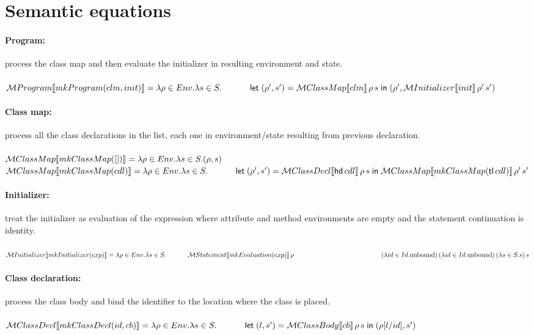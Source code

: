 \documentclass[11pt,a4paper,twoside]{article}
\begin{document}
\section{Semantic equations}

\paragraph{Program:} process the class map and then evaluate the initializer in resulting environment and state.\\\\
$\mathcal{M} Program|[mkProgram(clm, init)|] = \lambda\rho\in Env.\lambda s\in S.\\\mathtt{\;\;\;\;\;\;\;\;\;\;\;\;}\mathsf{let\;} (\rho', s') = \mathcal{M} ClassMap|[clm|]\,\rho\,s \mathsf{\;in\;} (\rho', \mathcal{M} Initializer|[init|]\,\rho'\,s')\\$

\paragraph{Class map:} process all the class declarations in the list, each one in environment/state resulting from previous declaration.\\\\
$\mathcal{M} ClassMap|[mkClassMap([])|] = \lambda\rho\in Env.\lambda s\in S.(\rho, s)$\\
$\mathcal{M} ClassMap|[mkClassMap(cdl)|] = \lambda\rho\in Env.\lambda s\in S.\\\mathtt{\;\;\;\;\;\;\;\;\;\;\;\;}\mathsf{let\;} (\rho', s') = \mathcal{M} ClassDecl|[\mathsf{hd}\, cdl|]\,\rho\,s \mathsf{\;in\;} \mathcal{M} ClassMap|[mkClassMap(\mathsf{tl}\, cdl)|]\,\rho'\,s'\\$

\paragraph{Initializer:} treat the initializer as evaluation of the expression where attribute and method environments are empty and the statement continuation is identity.\\\\
$\mathcal{M} Initializer|[mkInitializer(exp)|] = \lambda\rho\in Env.\lambda s\in S.\\\mathtt{\;\;\;\;\;\;\;\;\;\;\;\;}\mathcal{M} Statement|[mkEvaluation(exp)|]\,\rho\,\\\mathtt{\;\;\;\;\;\;\;\;\;\;\;\;}\mathtt{\;\;\;\;\;\;\;\;\;\;\;\;}\mathtt{\;\;\;\;\;\;\;\;\;\;\;\;}\mathtt{\;\;\;\;\;\;\;\;\;\;\;\;}(\lambda id\in Id.\mathrm{unbound})\,(\lambda id\in Id.\mathrm{unbound})\,(\lambda s\in S.s)\,s\\$

\paragraph{Class declaration:} process the class body and bind the identifier to the location where the class is placed.\\\\
$\mathcal{M} ClassDecl|[mkClassDecl(id, cb)|] = \lambda\rho\in Env.\lambda s\in S.\\\mathtt{\;\;\;\;\;\;\;\;\;\;\;\;}\mathsf{let\;} (l, s') = \mathcal{M} ClassBody|[cb|]\,\rho\,s \mathsf{\;in\;} (\rho[l/id], s')\\$
\end{document}

